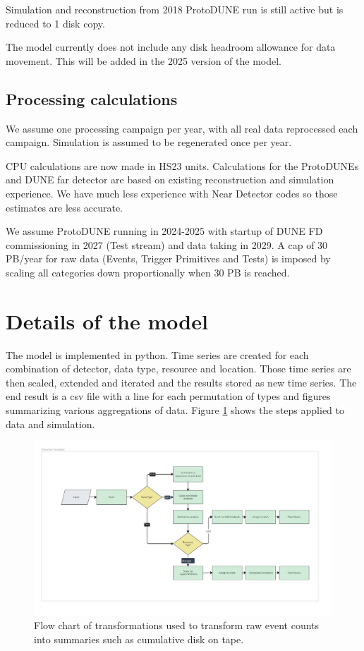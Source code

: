 \documentclass[12pt]{article}
\begin{document}
Simulation and reconstruction from 2018 ProtoDUNE run is still active but is reduced to 1 disk copy. 

The model currently does not include any disk headroom allowance for data movement.  This will be added in the 2025 version of the model. 

\subsection{Processing calculations}

 We assume one processing campaign per year, with all real data reprocessed each campaign.   Simulation is assumed to be regenerated  once per year.
   
CPU calculations are now made in HS23 units.  Calculations for the ProtoDUNEs and DUNE far detector are based on existing reconstruction and simulation experience.  We have much less experience with Near Detector codes so those estimates are less accurate.

We assume ProtoDUNE running in 2024-2025 with startup of DUNE FD commissioning in 2027 (Test stream) and data taking in 2029. A cap of 30 PB/year for raw data (Events, Trigger Primitives and Tests) is imposed by scaling all categories down proportionally when 30 PB is reached. 

   
     
  \section{Details of the model}
  
  The model is implemented in python.  Time series are created for each combination of detector, data type, resource and location.  Those time series are then  scaled, extended and iterated and the results stored as new time series.  The end result is a csv file with a line for each permutation of types and figures summarizing various aggregations of data. Figure \ref{fig:Flowchart} shows the steps applied to data and simulation. 
  
  \begin{figure}[ht]
\centering
\includegraphics[width=0.99 \textwidth]{Flowchart.pdf}
\caption{Flow chart of transformations used to transform raw event counts into summaries such as cumulative disk on tape. }
\label{fig:Flowchart}
\end{figure} 
  
\end{document}
